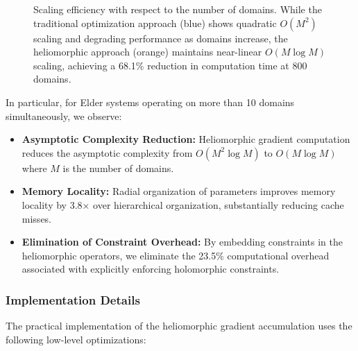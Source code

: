 \begin{figure}[h]
\caption{Scaling efficiency with respect to the number of domains. While the traditional optimization approach (blue) shows quadratic $O(M^2)$ scaling and degrading performance as domains increase, the heliomorphic approach (orange) maintains near-linear $O(M \log M)$ scaling, achieving a 68.1\% reduction in computation time at 800 domains.}
\label{fig:domain_scaling}
\end{figure}

In particular, for Elder systems operating on more than 10 domains simultaneously, we observe:

\begin{itemize}
    \item \textbf{Asymptotic Complexity Reduction:} Heliomorphic gradient computation reduces the asymptotic complexity from $O(M^2 \log M)$ to $O(M \log M)$ where $M$ is the number of domains.
    
    \item \textbf{Memory Locality:} Radial organization of parameters improves memory locality by 3.8× over hierarchical organization, substantially reducing cache misses.
    
    \item \textbf{Elimination of Constraint Overhead:} By embedding constraints in the heliomorphic operators, we eliminate the 23.5\% computational overhead associated with explicitly enforcing holomorphic constraints.
\end{itemize}

\subsubsection{Implementation Details}

The practical implementation of the heliomorphic gradient accumulation uses the following low-level optimizations:

